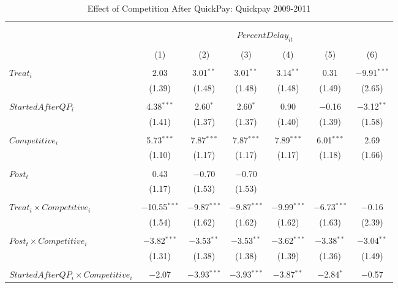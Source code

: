 \documentclass[
]{article}
\begin{document}
\begin{table}[H] \centering 
  \caption{Effect of Competition After QuickPay: Quickpay 2009-2011} 
  \label{} 
\small 
\begin{tabular}{@{\extracolsep{-3pt}}lcccccc} 
\\[-1.8ex]\hline 
\hline \\[-1.8ex] 
\\[-1.8ex] & \multicolumn{6}{c}{$PercentDelay_{it}$  } \\ 
\\[-1.8ex] & (1) & (2) & (3) & (4) & (5) & (6)\\ 
\hline \\[-1.8ex] 
 $Treat_i$ & 2.03 & 3.01$^{**}$ & 3.01$^{**}$ & 3.14$^{**}$ & 0.31 & $-$9.91$^{***}$ \\ 
  & (1.39) & (1.48) & (1.48) & (1.48) & (1.49) & (2.65) \\ 
  & & & & & & \\ 
 $StartedAfterQP_i$ & 4.38$^{***}$ & 2.60$^{*}$ & 2.60$^{*}$ & 0.90 & $-$0.16 & $-$3.12$^{**}$ \\ 
  & (1.41) & (1.37) & (1.37) & (1.40) & (1.39) & (1.58) \\ 
  & & & & & & \\ 
 $Competitive_i$ & 5.73$^{***}$ & 7.87$^{***}$ & 7.87$^{***}$ & 7.89$^{***}$ & 6.01$^{***}$ & 2.69 \\ 
  & (1.10) & (1.17) & (1.17) & (1.17) & (1.18) & (1.66) \\ 
  & & & & & & \\ 
 $Post_t$ & 0.43 & $-$0.70 & $-$0.70 &  &  &  \\ 
  & (1.17) & (1.53) & (1.53) &  &  &  \\ 
  & & & & & & \\ 
 $Treat_i \times Competitive_i$ & $-$10.55$^{***}$ & $-$9.87$^{***}$ & $-$9.87$^{***}$ & $-$9.99$^{***}$ & $-$6.73$^{***}$ & $-$0.16 \\ 
  & (1.54) & (1.62) & (1.62) & (1.62) & (1.63) & (2.39) \\ 
  & & & & & & \\ 
 $Post_t \times Competitive_i$ & $-$3.82$^{***}$ & $-$3.53$^{**}$ & $-$3.53$^{**}$ & $-$3.62$^{***}$ & $-$3.38$^{**}$ & $-$3.04$^{**}$ \\ 
  & (1.31) & (1.38) & (1.38) & (1.39) & (1.36) & (1.49) \\ 
  & & & & & & \\ 
 $StartedAfterQP_i \times Competitive_i$ & $-$2.07 & $-$3.93$^{***}$ & $-$3.93$^{***}$ & $-$3.87$^{**}$ & $-$2.84$^{*}$ & $-$0.57 \\ 

\end{tabular}
\end{table}
\end{document}
